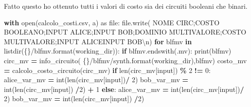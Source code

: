 \documentclass[
  italian,
]{book}
\newenvironment{Shaded}{\begin{snugshade}}{\end{snugshade}}
\newcommand{\BuiltInTok}[1]{#1}
\newcommand{\CharTok}[1]{\textcolor[rgb]{0.31,0.60,0.02}{#1}}
\newcommand{\ControlFlowTok}[1]{\textcolor[rgb]{0.13,0.29,0.53}{\textbf{#1}}}
\newcommand{\DecValTok}[1]{\textcolor[rgb]{0.00,0.00,0.81}{#1}}
\newcommand{\ImportTok}[1]{#1}
\newcommand{\KeywordTok}[1]{\textcolor[rgb]{0.13,0.29,0.53}{\textbf{#1}}}
\newcommand{\NormalTok}[1]{#1}
\newcommand{\OperatorTok}[1]{\textcolor[rgb]{0.81,0.36,0.00}{\textbf{#1}}}
\newcommand{\SpecialCharTok}[1]{\textcolor[rgb]{0.00,0.00,0.00}{#1}}
\newcommand{\StringTok}[1]{\textcolor[rgb]{0.31,0.60,0.02}{#1}}
\begin{document}
Fatto questo ho ottenuto tutti i valori di costo sia dei circuiti booleani che binari.

\begin{Shaded}
\begin{Highlighting}[]
\ControlFlowTok{with} \BuiltInTok{open}\NormalTok{(}\StringTok{\textquotesingle{}calcolo\_costi.csv\textquotesingle{}}\NormalTok{, }\StringTok{\textquotesingle{}a\textquotesingle{}}\NormalTok{) }\ImportTok{as} \BuiltInTok{file}\NormalTok{:}
    \BuiltInTok{file}\NormalTok{.write(}
        \StringTok{\textquotesingle{}NOME CIRC;COSTO BOOLEANO;INPUT ALICE;INPUT BOB;DOMINIO MULTIVALORE;COSTO MULTIVALORE;INPUT ALICEINPUT BOB}\CharTok{\textbackslash{}n}\StringTok{\textquotesingle{}}\NormalTok{)}
    \ControlFlowTok{for}\NormalTok{ blfmv }\KeywordTok{in}\NormalTok{ listdir(}\StringTok{\textquotesingle{}}\SpecialCharTok{\{\}}\StringTok{/blfmv\textquotesingle{}}\NormalTok{.}\BuiltInTok{format}\NormalTok{(working\_dir)):}
        \ControlFlowTok{if}\NormalTok{ blfmv.endswith(}\StringTok{\textquotesingle{}.mv\textquotesingle{}}\NormalTok{):}
            \BuiltInTok{print}\NormalTok{(blfmv)}
\NormalTok{            circ\_mv }\OperatorTok{=}\NormalTok{ info\_circuito(}
                \StringTok{\textquotesingle{}}\SpecialCharTok{\{\}}\StringTok{/blfmv/synth\textquotesingle{}}\NormalTok{.}\BuiltInTok{format}\NormalTok{(working\_dir),blfmv)}
\NormalTok{            costo\_mv }\OperatorTok{=}\NormalTok{ calcolo\_costo\_circuito(circ\_mv)}
            \ControlFlowTok{if} \BuiltInTok{len}\NormalTok{(circ\_mv[}\StringTok{\textquotesingle{}input\textquotesingle{}}\NormalTok{]) }\OperatorTok{\%} \DecValTok{2} \OperatorTok{!=} \DecValTok{0}\NormalTok{:}
\NormalTok{                alice\_var\_mv }\OperatorTok{=} \BuiltInTok{int}\NormalTok{(}\BuiltInTok{len}\NormalTok{(circ\_mv[}\StringTok{\textquotesingle{}input\textquotesingle{}}\NormalTok{])}\OperatorTok{/} \DecValTok{2}\NormalTok{)}
\NormalTok{                bob\_var\_mv }\OperatorTok{=} \BuiltInTok{int}\NormalTok{(}\BuiltInTok{len}\NormalTok{(circ\_mv[}\StringTok{\textquotesingle{}input\textquotesingle{}}\NormalTok{]) }\OperatorTok{/}\DecValTok{2}\NormalTok{) }\OperatorTok{+} \DecValTok{1}
            \ControlFlowTok{else}\NormalTok{:}
\NormalTok{                alice\_var\_mv }\OperatorTok{=} \BuiltInTok{int}\NormalTok{(}\BuiltInTok{len}\NormalTok{(circ\_mv[}\StringTok{\textquotesingle{}input\textquotesingle{}}\NormalTok{])}\OperatorTok{/} \DecValTok{2}\NormalTok{)}
\NormalTok{                bob\_var\_mv }\OperatorTok{=} \BuiltInTok{int}\NormalTok{(}\BuiltInTok{len}\NormalTok{(circ\_mv[}\StringTok{\textquotesingle{}input\textquotesingle{}}\NormalTok{]) }\OperatorTok{/}\DecValTok{2}\NormalTok{)}

\end{Highlighting}
\end{Shaded}
\end{document}
